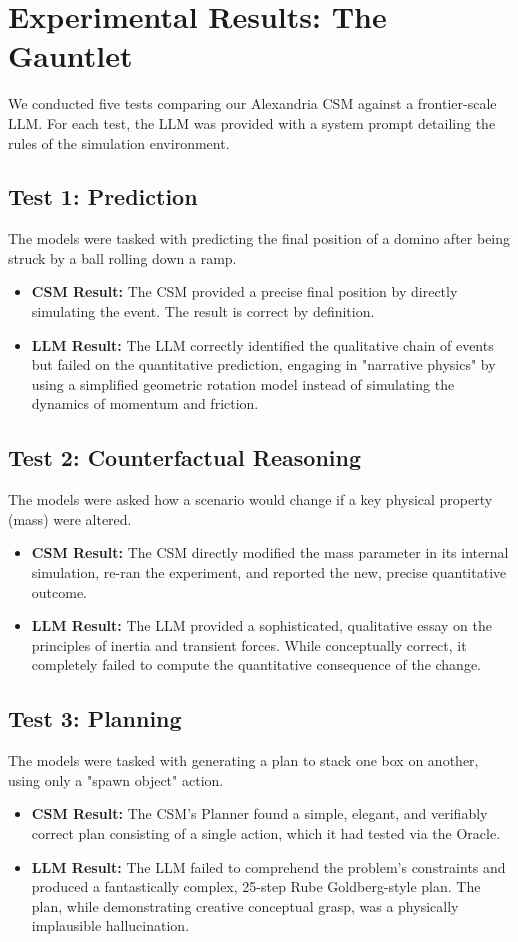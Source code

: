 \documentclass[11pt, letterpaper]{article}
\begin{document}
\section{Experimental Results: The Gauntlet}
We conducted five tests comparing our Alexandria CSM against a frontier-scale LLM. For each test, the LLM was provided with a system prompt detailing the rules of the simulation environment.

\subsection{Test 1: Prediction}
The models were tasked with predicting the final position of a domino after being struck by a ball rolling down a ramp.
\begin{itemize}
    \item \textbf{CSM Result:} The CSM provided a precise final position by directly simulating the event. The result is correct by definition.
    \item \textbf{LLM Result:} The LLM correctly identified the qualitative chain of events but failed on the quantitative prediction, engaging in "narrative physics" by using a simplified geometric rotation model instead of simulating the dynamics of momentum and friction.
\end{itemize}

\subsection{Test 2: Counterfactual Reasoning}
The models were asked how a scenario would change if a key physical property (mass) were altered.
\begin{itemize}
    \item \textbf{CSM Result:} The CSM directly modified the mass parameter in its internal simulation, re-ran the experiment, and reported the new, precise quantitative outcome.
    \item \textbf{LLM Result:} The LLM provided a sophisticated, qualitative essay on the principles of inertia and transient forces. While conceptually correct, it completely failed to compute the quantitative consequence of the change.
\end{itemize}

\subsection{Test 3: Planning}
The models were tasked with generating a plan to stack one box on another, using only a "spawn object" action.
\begin{itemize}
    \item \textbf{CSM Result:} The CSM's Planner found a simple, elegant, and verifiably correct plan consisting of a single action, which it had tested via the Oracle.
    \item \textbf{LLM Result:} The LLM failed to comprehend the problem's constraints and produced a fantastically complex, 25-step Rube Goldberg-style plan. The plan, while demonstrating creative conceptual grasp, was a physically implausible hallucination.
\end{itemize}
\end{document}
